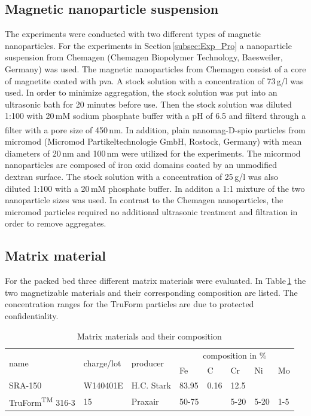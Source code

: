 \subsection{Magnetic nanoparticle suspension}
\label{subsec:Mag_nanoparticles}
The experiments were conducted with two different types of magnetic nanoparticles. For the experiments in Section\,\ref{subsec:Exp_Pro} a nanoparticle suspension from Chemagen (Chemagen Biopolymer Technology, Baesweiler, Germany) was used. The magnetic nanoparticles from Chemagen consist of a core of magnetite coated with \gls{pva}. A stock solution with a concentration of 73\,g/l was used. In order to minimize aggregation, the stock solution was put into an ultrasonic bath for 20 minutes before use. Then the stock solution was diluted 1:100 with 20\,mM sodium phosphate buffer with a pH of 6.5 and filterd through a filter with a pore size of 450\,nm. 
In addition,  plain nanomag\textsuperscript{\textregistered}-D-spio particles from micromod (Micromod Partikeltechnologie GmbH, Rostock, Germany) with mean diameters of 20\,nm and 100\,nm were utilized for the experiments. The micormod nanoparticles are composed of iron oxid domains coated by an unmodified dextran surface. The stock solution with a concentration of 25\,g/l was also diluted 1:100 with a 20\,mM phosphate buffer. In additon a 1:1 mixture of the two nanoparticle sizes was used. In contrast to the Chemagen nanoparticles, the micromod particles required no additional ultrasonic treatment and filtration in order to remove aggregates.     

\subsection{Matrix material}
\label{subsec:Matrix_mat}
For the packed bed three different matrix materials were evaluated. In Table\,\ref{table:mat_material} the two magnetizable materials and their corresponding composition are listed. The concentration ranges for the TruForm particles are due to protected confidentiality. %

\begin{table}[H]
\centering
\caption{Matrix materials and their composition}
\label{table:mat_material}
\begin{tabular}{llllllll}\hline
\multirow{2}{*}{name} & \multirow{2}{*}{charge/lot} & \multirow{2}{*}{producer} & \multicolumn{5}{c}{composition in \%}  \\
& & & Fe & C & Cr & Ni & Mo \\
\hline\hline
SRA-150 & W140401E & H.C. Stark & 83.95 & 0.16 & 12.5  & & \\
TruForm\textsuperscript{TM} 316-3 & 15 & Praxair & 50-75 & & 5-20 &5-20& 1-5\\
\hline
\end{tabular}
\end{table}

